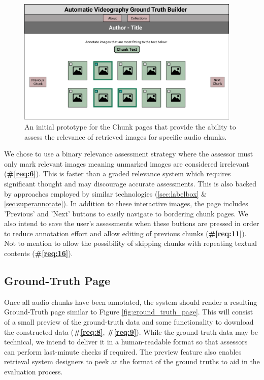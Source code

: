 \documentclass{l4proj}
\begin{document}
\begin{figure}
    \centering
    \includegraphics[width=0.95\textwidth]{figures/chunk_page.pdf}
    \caption{An initial prototype for the Chunk pages that provide the ability to assess the relevance of retrieved images for specific audio chunks.}
    \label{fig:chunk_page}
\end{figure}

We chose to use a binary relevance assessment strategy where the assessor must only mark relevant images meaning unmarked images are considered irrelevant (\textbf{\#\ref{req:6}}). This is faster than a graded relevance system which requires significant thought and may discourage accurate assessments. This is also backed by approaches employed by similar technologies (\ref{sec:labelbox} \& \ref{sec:superannotate}). In addition to these interactive images, the page includes 'Previous' and 'Next' buttons to easily navigate to bordering chunk pages. We also intend to save the user's assessments when these buttons are pressed in order to reduce annotation effort and allow editing of previous chunks (\textbf{\#\ref{req:11}}). Not to mention to allow the possibility of skipping chunks with repeating textual contents (\textbf{\#\ref{req:16}}).

\subsection{Ground-Truth Page}
Once all audio chunks have been annotated, the system should render a resulting Ground-Truth page similar to Figure \ref{fig:ground_truth_page}. This will consist of a small preview of the ground-truth data and some functionality to download the constructed data (\textbf{\#\ref{req:8}}, \textbf{\#\ref{req:9}}). While the ground-truth data may be technical, we intend to deliver it in a human-readable format so that assessors can perform last-minute checks if required. The preview feature also enables retrieval system designers to peek at the format of the ground truths to aid in the evaluation process.
\end{document}
